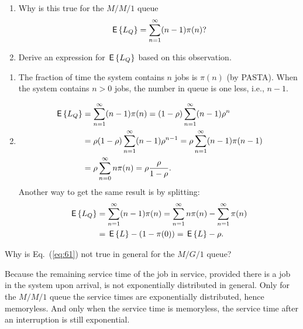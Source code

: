 \begin{question}
  \begin{enumerate}
  \item Why is this true for the $M/M/1$ queue
  \begin{equation*}
\,\mathsf{E}\left\{L_Q\right\} = \sum_{n=1}^\infty (n-1)\pi(n)?
  \end{equation*}
\item   Derive an expression for $\,\mathsf{E}\left\{L_Q\right\}$ based on this observation.
  \end{enumerate}
  \begin{solution}
    \begin{enumerate}
    \item 
    The fraction of time the system contains $n$ jobs is $\pi(n)$ (by
    PASTA). When the system contains $n>0$ jobs, the number in queue
    is one less, i.e., $n-1$.
  \item 
    \begin{equation*}
      \begin{split}
\,\mathsf{E}\left\{L_Q\right\} 
&= \sum_{n=1}^\infty (n-1)\pi(n) 
= (1-\rho)\sum_{n=1}^\infty (n-1) \rho^n\\
&= \rho (1-\rho)\sum_{n=1}^\infty (n-1) \rho^{n-1}
= \rho \sum_{n=1}^\infty (n-1) \pi(n-1)\\
&= \rho \sum_{n=0}^\infty n \pi(n)
= \rho \frac{\rho}{1-\rho}.
      \end{split}
    \end{equation*}
Another way to get the same result is by splitting: 
\begin{equation*}
  \begin{split}
\,\mathsf{E}\left\{L_Q\right\} 
&= \sum_{n=1}^\infty (n-1)\pi(n) 
=\sum_{n=1}^\infty n\pi(n) -\sum_{n=1}^\infty \pi(n)\\
&= \,\mathsf{E}\left\{L\right\} - (1-\pi(0)) = \,\mathsf{E}\left\{L\right\} - \rho.
  \end{split}
\end{equation*}
    \end{enumerate}
  \end{solution}
\end{question}

\begin{question}
  Why is Eq.~(\ref{eq:61}) not true in general for the $M/G/1$ queue?
  \begin{solution}
    Because the remaining service time of the job in service, provided
    there is a job in the system upon arrival, is not exponentially
    distributed in general. Only for the $M/M/1$ queue the service
    times are exponentially distributed, hence memoryless. And only
    when the service time is memoryless, the service time after an
    interruption is still exponential.
  \end{solution}
\end{question}

